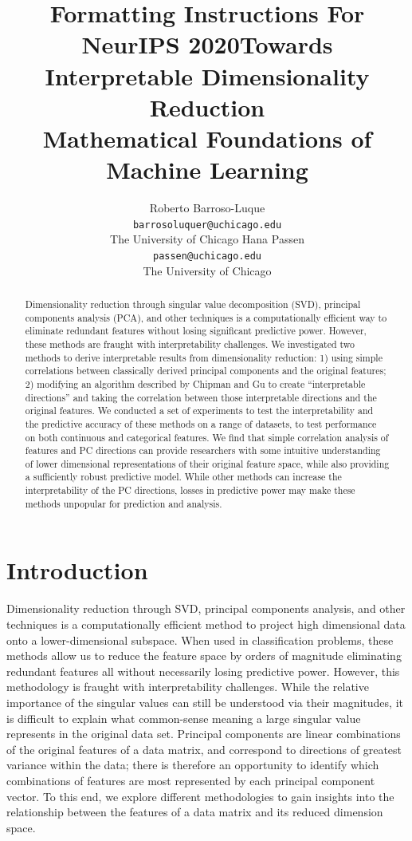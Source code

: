 \documentclass{article}
\title{Formatting Instructions For NeurIPS 2020}
\title{Towards Interpretable Dimensionality Reduction\\
	\large Mathematical Foundations of Machine Learning}
\author{Roberto Barroso-Luque \\
	\texttt{barrosoluquer@uchicago.edu}  \\
	The University of Chicago
	\AND
	Hana Passen\\
	\texttt{passen@uchicago.edu} \\
    The University of Chicago\\}
\begin{document}
\maketitle

\begin{abstract}{
Dimensionality reduction through singular value decomposition (SVD), principal components analysis (PCA), and other techniques is a computationally efficient way to eliminate redundant features without losing significant predictive power. However, these methods are fraught with interpretability challenges. We investigated two methods to derive interpretable results from dimensionality reduction: 1) using simple correlations between classically derived principal components and the original features; 2) modifying an algorithm described by Chipman and Gu to create “interpretable directions” and taking the correlation between those interpretable directions and the original features. We conducted a set of experiments to test the interpretability and the predictive accuracy of these methods on a range of datasets, to test performance on both continuous and categorical features. We find that simple correlation analysis of features and PC directions can provide researchers with some intuitive understanding of lower dimensional representations of their original feature space, while also providing a sufficiently robust predictive model. While other methods can increase the interpretability of the PC directions, losses in predictive power may make these methods unpopular for prediction and analysis.}  
\end{abstract}

\newpage
\section{Introduction}
Dimensionality reduction through SVD, principal components analysis, and other techniques is a computationally efficient method to project high dimensional data onto a lower-dimensional subspace. When used in classification problems, these methods allow us to reduce the feature space by orders of magnitude eliminating redundant features all without necessarily losing predictive power. However, this methodology is fraught with interpretability challenges. While the relative importance of the singular values can still be understood via their magnitudes, it is difficult to explain what common-sense meaning a large singular value represents in the original data set. Principal components are linear combinations of the original features of a data matrix, and correspond to directions of greatest variance within the data; there is therefore an opportunity to identify which combinations of features are most represented by each principal component vector. To this end, we explore different methodologies to gain insights into the relationship between the features of a data matrix and its reduced dimension space.
\end{document}
